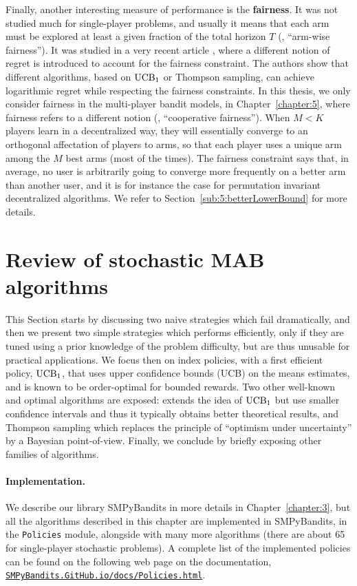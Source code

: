 Finally, another interesting measure of performance is the \textbf{fairness}.
It was not studied much for single-player problems, and usually it means that each arm must be explored at least a given fraction of the total horizon $T$ (\ie, ``arm-wise fairness'').
It was studied in a very recent article \cite{Patil2019stochastic},
where a different notion of regret is introduced to account for the fairness constraint. The authors show that different algorithms, based on $\mathrm{UCB}_1$ or Thompson sampling, can achieve logarithmic regret while respecting the fairness constraints.
%
In this thesis, we only consider fairness in the multi-player bandit models,
in Chapter~\ref{chapter:5}, where fairness refers to a different notion (\ie, ``cooperative fairness'').
When $M<K$ players learn in a decentralized way, they will essentially converge to an orthogonal affectation of players to arms, so that each player uses a unique arm among the $M$ best arms (most of the times).
The fairness constraint says that, in average, no user is arbitrarily going to converge more frequently on a better arm than another user, and it is for instance the case for permutation invariant decentralized algorithms.
We refer to Section~\ref{sub:5:betterLowerBound} for more details.


\section{Review of stochastic MAB algorithms}
\label{sec:2:famousMABalgorithms}

This Section starts by discussing two naive strategies which fail dramatically,
%
and then we present two simple strategies which performs efficiently, only if they are tuned using a prior knowledge of the problem difficulty, but are thus unusable for practical applications.
%
We focus then on index policies, with a first efficient policy, $\mathrm{UCB}_1$, that uses upper confidence bounds (UCB) on the means estimates, and is known to be order-optimal for bounded rewards.
Two other well-known and optimal algorithms are exposed: \klUCB{} extends the idea of $\mathrm{UCB}_1$ but use smaller confidence intervals and thus it typically obtains better theoretical results, and Thompson sampling which replaces the principle of ``optimism under uncertainty'' by a Bayesian point-of-view.
%
Finally, we conclude by briefly exposing other families of algorithms.


\paragraph{Implementation.}
%
We describe our library SMPyBandits in more details in Chapter~\ref{chapter:3}, but all the algorithms described in this chapter are implemented in SMPyBandits, in the \texttt{Policies} module, alongside with many more algorithms (there are about 65 for single-player stochastic problems).
A complete list of the implemented policies can be found on the following web page on the documentation,
\href{https://smpybandits.github.io/docs/Policies.html}{\texttt{SMPyBandits.GitHub.io/docs/Policies.html}}.


